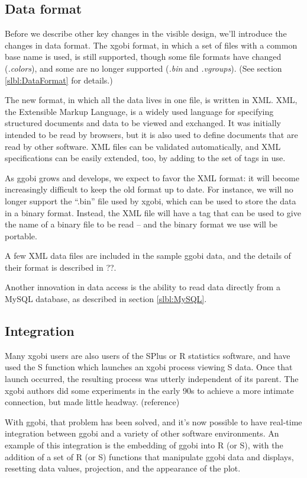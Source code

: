 \documentclass[11pt]{article}
\begin{document}
\subsection {Data format}

Before we describe other key changes in the visible design, we'll
introduce the changes in data format.  The xgobi format, in which a
set of files with a common base name is used, is still supported,
though some file formats have changed ({\em .colors}), and some are
no longer supported ({\em .bin} and {\em .vgroups}).  (See section
\ref{slbl:DataFormat} for details.)

The new format, in which all the data lives in one file, is written
in XML.  XML, the Extensible Markup Language, is a widely used
language for specifying structured documents and data to be viewed
and exchanged.  It was initially intended to be read by browsers, but
it is also used to define documents that are read by other software.
XML files can be validated automatically, and XML specifications can
be easily extended, too, by adding to the set of tags in use.

As ggobi grows and develops, we expect to favor the XML format:  it
will become increasingly difficult to keep the old format up to
date.  For instance, we will no longer support the ``.bin'' file used
by xgobi, which can be used to store the data in a binary format.
Instead, the XML file will have a tag that can be used to give the
name of a binary file to be read -- and the binary format we use will
be portable.

A few XML data files are included in the sample ggobi data, and
the details of their format is described in ??.

Another innovation in data access is the ability to read data
directly from a MySQL database, as described in section \ref{slbl:MySQL}.

\subsection{Integration}

Many xgobi users are also users of the SPlus or R statistics
software, and have used the S function which launches an xgobi
process viewing S data.  Once that launch occurred, the resulting
process was utterly independent of its parent.  The xgobi authors
did some experiments in the early 90s to achieve a more intimate
connection, but made little headway.  (reference)

With ggobi, that problem has been solved, and it's now possible
to have real-time integration between ggobi and a variety of
other software environments.  An example of this integration is
the embedding of ggobi into R (or S), with the addition of a set of
R (or S) functions that manipulate ggobi data and displays,
resetting data values, projection, and the appearance of the plot.
\end{document}
